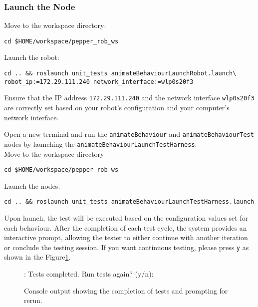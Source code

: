 \documentclass{CSSRforAfrica}
\begin{document}
\subsubsection*{Launch the Node}
Move to the workspace directory:\\
\begin{lstlisting}[style=linuxbashstyle]
cd $HOME/workspace/pepper_rob_ws
\end{lstlisting}
Launch the robot:\\
\begin{lstlisting}[style=linuxbashstyle]
cd .. && roslaunch unit_tests animateBehaviourLaunchRobot.launch\
robot_ip:=172.29.111.240 network_interface:=wlp0s20f3
\end{lstlisting}
\begin{tcolorbox}[colback=yellow!20,colframe=yellow!50!black,title=NOTE]
Ensure that the IP address \texttt{172.29.111.240} and the network interface \texttt{wlp0s20f3} are correctly set based on your robot's configuration and your computer's network interface.
\end{tcolorbox}
\noindent Open a new terminal and run the \texttt{animateBehaviour} and \texttt{animateBehaviourTest} nodes by launching the \texttt{animateBehaviourLaunchTestHarness}.\\
Move to the workspace directory\\
\begin{lstlisting}[style=linuxbashstyle]
cd $HOME/workspace/pepper_rob_ws
\end{lstlisting}

Launch the nodes:\\
\begin{lstlisting}[style=linuxbashstyle]
cd .. && roslaunch unit_tests animateBehaviourLaunchTestHarness.launch
\end{lstlisting}
Upon launch, the test will be executed based on the configuration values set for each behaviour. After the completion of each test cycle, the system provides an interactive prompt, allowing the tester to either continue with another iteration or conclude the testing session. If you want continuous testing, please press \texttt{y} as shown in the Figure\ref{fig:console-output}.\\
\begin{figure}[htbp]
\begin{tcolorbox}[
    colback=black!90,
    coltext=white,
    colframe=black!75,
    width=\textwidth,
    arc=0mm
]
[ INFO] [1734104535.211006577]: Tests completed. Run tests again? (y/n):
\end{tcolorbox}
\caption{Console output showing the completion of tests and prompting for rerun.}
\label{fig:console-output}
\end{figure}
\vspace{1em}
\end{document}
